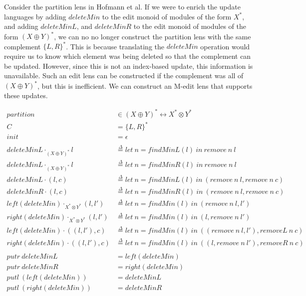 \documentclass[a4paper,10pt]{article}
\newcommand{\defeq}{\ensuremath{\stackrel{\Delta}{=}}}
\begin{document}
Consider the partition lens in Hofmann et al. If we were to enrich the update languages by adding $deleteMin$ to the edit monoid of modules of the form $X^*$, and adding $deleteMinL$, and $deleteMinR$ to the edit monoid of modules of the form $(X \oplus Y)^*$, we can no no longer construct the partition lens with the same complement $\{L,R\}^*$. This is because translating the $deleteMin$ operation would require us to know which element was being deleted so that the complement can be updated. However, since this is not an index-based update, this information is unavailable. Such an edit lens can be constructed if the complement was all of $(X \oplus Y)^*$, but this is inefficient. We can construct an M-edit lens that supports these updates.

  \begin{align*}
    partition &\in (X \oplus Y)^* \leftrightarrow X^* \otimes Y^* \\
    C &= \{L, R\}^* \\
    init &= \epsilon \\
    ~\\
    deleteMinL \cdot_{(X \oplus Y)^*} l &\defeq let~n = findMinL(l)~in~remove~n~l \\
    deleteMinL \cdot_{(X \oplus Y)^*} l &\defeq let~n = findMinR(l)~in~remove~n~l \\
    deleteMinL \cdot (l, c) &\defeq let~n = findMinL(l)~in~(remove~n~l, remove~n~c) \\
    deleteMinR \cdot (l, c) &\defeq let~n = findMinR(l)~in~(remove~n~l, remove~n~c) \\
    left(deleteMin) \cdot_{X^* \otimes Y^*} (l, l') &\defeq let~n = findMin(l)~in~(remove~n~l, l')\\
    right(deleteMin) \cdot_{X^* \otimes Y^*} (l, l') &\defeq let~n = findMin(l)~in~(l, remove~n~l') \\
    left(deleteMin) \cdot ((l, l'), c) &\defeq let~n = findMin(l)~in~((remove~n~l, l'), removeL~n~c) \\
    right(deleteMin) \cdot ((l, l'), c) &\defeq let~n = findMin(l)~in~((l, remove~n~l'), removeR~n~c) \\
    ~\\
    putr~deleteMinL &= left(deleteMin) \\
    putr~deleteMinR &= right(deleteMin) \\
    putl~(left(deleteMin)) &= deleteMinL \\
    putl~(right(deleteMin)) &= deleteMinR \\
  \end{align*}
\end{document}
